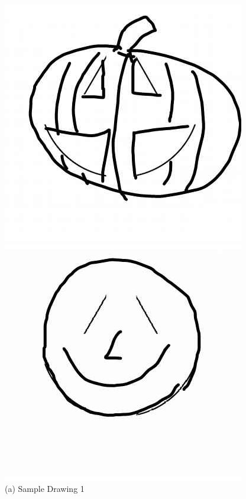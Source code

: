 \documentclass[../Proposal_Writing_Sample.tex]{subfiles}
\begin{document}
\begin{figure}[]
    \centering
    \begin{minipage}{0.45\textwidth}
        \centering
        \includegraphics[width=\linewidth]{sample_drawing_AuDrA/example1.jpg}
        \caption*{(a) Sample Drawing 1}
    \end{minipage}\hfill
    \begin{minipage}{0.45\textwidth}
        \centering
        \includegraphics[width=\linewidth]{sample_drawing_AuDrA/example2.jpg}

\end{minipage}
\end{figure}
\end{document}
